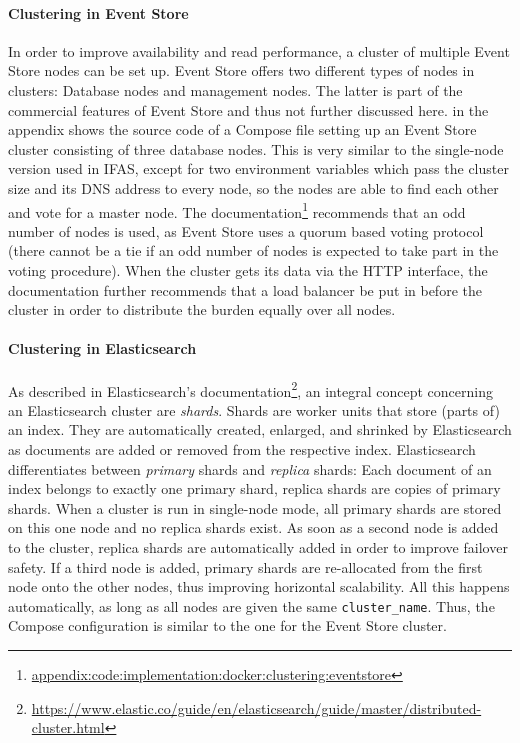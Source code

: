 \paragraph{Clustering in Event Store}
In order to improve availability and read performance, a cluster of multiple Event Store nodes can be set up.
Event Store offers two different types of nodes in clusters: Database nodes and management nodes.
The latter is part of the commercial features of Event Store and thus not further discussed here.
 in the appendix shows the source code of a Compose file setting up an Event Store cluster consisting of three database nodes.
This is very similar to the single-node version used in \ac{IFAS}, except for two environment variables which pass the cluster size and its DNS address to every node, so the nodes are able to find each other and vote for a master node.
The documentation\footnote{\url{appendix:code:implementation:docker:clustering:eventstore}} recommends that an odd number of nodes is used, as Event Store uses a quorum based voting protocol (there cannot be a tie if an odd number of nodes is expected to take part in the voting procedure).
When the cluster gets its data via the \ac{HTTP} interface, the documentation further recommends that a load balancer be put in before the cluster in order to distribute the burden equally over all nodes.

\paragraph{Clustering in Elasticsearch}
As described in Elasticsearch's documentation\footnote{\url{https://www.elastic.co/guide/en/elasticsearch/guide/master/distributed-cluster.html}}, an integral concept concerning an Elasticsearch cluster are \emph{shards}.
Shards are worker units that store (parts of) an index.
They are automatically created, enlarged, and shrinked by Elasticsearch as documents are added or removed from the respective index.
Elasticsearch differentiates between \emph{primary} shards and \emph{replica} shards: Each document of an index belongs to exactly one primary shard, replica shards are copies of primary shards.
When a cluster is run in single-node mode, all primary shards are stored on this one node and no replica shards exist.
As soon as a second node is added to the cluster, replica shards are automatically added in order to improve failover safety.
If a third node is added, primary shards are re-allocated from the first node onto the other nodes, thus improving horizontal scalability.
All this happens automatically, as long as all nodes are given the same \texttt{cluster\_name}.
Thus, the Compose configuration is similar to the one for the Event Store cluster.

